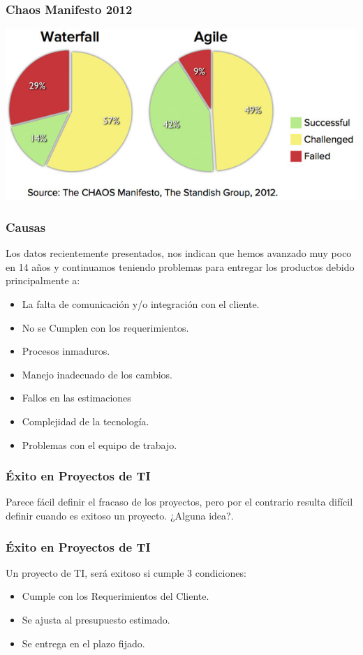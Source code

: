 \documentclass[12pt]{beamer}
\begin{document}
\begin{frame}
 \frametitle{Chaos Manifesto 2012}
 \begin{center}
    \includegraphics[scale=0.5]{img/agile.png}
 \end{center}
\end{frame}


\begin{frame}
\frametitle{Causas}
Los datos recientemente presentados, nos indican que hemos avanzado muy poco en 14 años y continuamos teniendo problemas 
para entregar los productos debido principalmente a:
\begin{itemize}
 \item<2-> La falta de comunicación y/o integración con el cliente.
 \item<3-> No se Cumplen con los requerimientos.
 \item<4-> Procesos inmaduros.
 \item<5-> Manejo inadecuado de los cambios.
 \item<6-> \alert{Fallos en las estimaciones}
 \item<7-> Complejidad de la tecnología.
 \item<8-> Problemas con el equipo de trabajo.
\end{itemize}
\end{frame}

\begin{frame}
 \frametitle{Éxito en Proyectos de TI}
Parece fácil definir el fracaso de los proyectos, pero por el contrario resulta difícil definir cuando es exitoso un proyecto.
\pause
¿Alguna idea?.
\end{frame}


\begin{frame}
 \frametitle{Éxito en Proyectos de TI}
Un proyecto de TI, será exitoso si cumple \alert{3 condiciones}:
\begin{itemize}
 \item<2-> Cumple con los Requerimientos del Cliente.
 \item<3-> Se ajusta al presupuesto estimado.
 \item<4-> Se entrega en el plazo fijado.
\end{itemize}
\end{frame}
\end{document}
